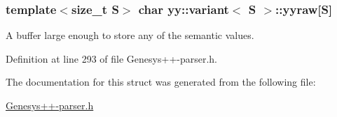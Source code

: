 \hypertarget{structyy_1_1variant_a888cad25e7084a89867ab29ab0837593}{
\subsubsection[{yyraw}]{\setlength{\rightskip}{0pt plus 5cm}template$<$size\-\_\-t S$>$ char {\bf yy\-::variant}$<$ S $>$\-::yyraw\mbox{[}S\mbox{]}}}\label{structyy_1_1variant_a888cad25e7084a89867ab29ab0837593}


A buffer large enough to store any of the semantic values. 



Definition at line 293 of file Genesys++-\/parser.\-h.



The documentation for this struct was generated from the following file\-:\begin{DoxyCompactItemize}
\item 
\hyperlink{_genesys_09_09-parser_8h}{Genesys++-\/parser.\-h}\end{DoxyCompactItemize}
